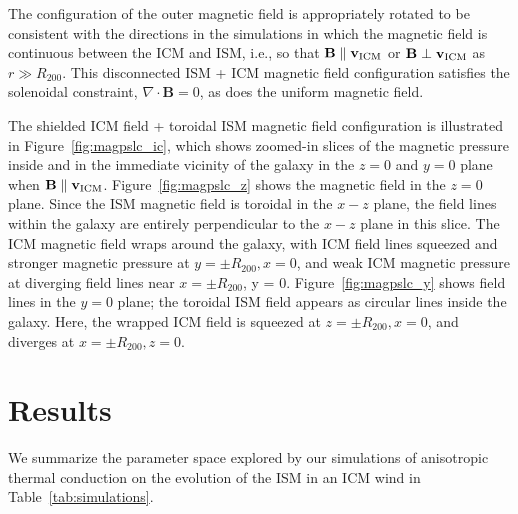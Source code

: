 \documentclass[twocolumn]{aastex6}
\begin{document}
The configuration of the outer magnetic field is appropriately rotated to be consistent with the directions in the simulations in which the magnetic field is continuous between the ICM and ISM, i.e., so that $\mathbf{B} \parallel \mathbf{v_{\rm ICM}}$ or $\mathbf{B} \perp \mathbf{v_{\rm ICM}}$ as $r \gg R_{200}$. This disconnected ISM + ICM magnetic field configuration satisfies the solenoidal constraint, $\nabla \cdot \mathbf{B} = 0$, as does the uniform magnetic field.

The  shielded ICM field + toroidal ISM magnetic field configuration is illustrated in Figure~\ref{fig:magpslc_ic}, which shows zoomed-in slices of the magnetic pressure inside and in the immediate vicinity of the galaxy in the $z = 0$ and $y = 0$ plane when $\mathbf{B} \parallel  \mathbf{v_{\rm ICM}}$. Figure~\ref{fig:magpslc_z} shows the magnetic field in the $z = 0$ plane. Since the ISM magnetic field is toroidal in the $x - z$  plane, the field lines within the galaxy
are entirely perpendicular to the $x - z$ plane in this slice. The ICM magnetic field wraps around the galaxy, with ICM field lines squeezed and stronger magnetic pressure at $y = \pm R_{200}, x = 0$, and weak ICM magnetic pressure at diverging field lines near  $x = \pm R_{200}$, y = 0. Figure~\ref{fig:magpslc_y} shows field lines in the $y = 0$ plane; the toroidal ISM field appears as circular lines inside the galaxy. Here, the wrapped ICM field is squeezed at $z = \pm R_{200}, x = 0$, and diverges at $x = \pm R_{200}, z = 0$.

\section{Results}
\label{sec:results}
We summarize the parameter space explored by our simulations of anisotropic thermal conduction on the evolution of the ISM in an ICM wind in
Table~\ref{tab:simulations}.
\end{document}
